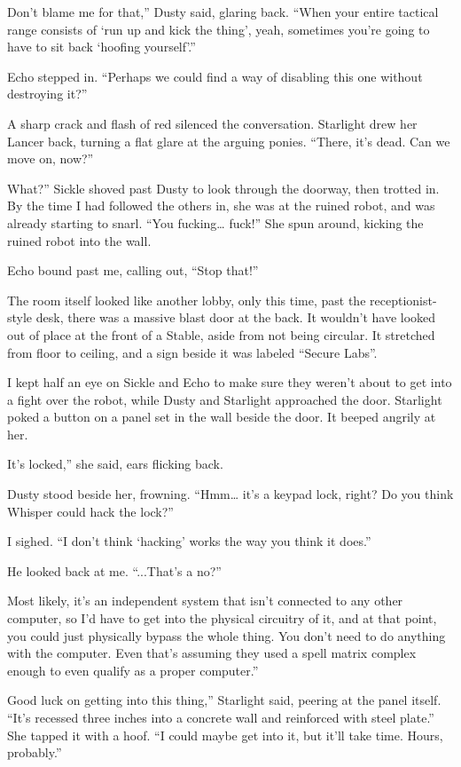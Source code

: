 \leavevmode{}Don’t blame me for that,” Dusty said, glaring back. “When your entire tactical range consists of ‘run up and kick the thing’, yeah, sometimes you’re going to have to sit back ‘hoofing yourself’.”

Echo stepped in. “Perhaps we could find a way of disabling this one without destroying it?”

A sharp crack and flash of red silenced the conversation. Starlight drew her Lancer back, turning a flat glare at the arguing ponies. “There, it’s dead. Can we move on, now?”

\leavevmode{}What?” Sickle shoved past Dusty to look through the doorway, then trotted in. By the time I had followed the others in, she was at the ruined robot, and was already starting to snarl. “You fucking… fuck!” She spun around, kicking the ruined robot into the wall.

Echo bound past me, calling out, “Stop that!”

The room itself looked like another lobby, only this time, past the receptionist-style desk, there was a massive blast door at the back. It wouldn’t have looked out of place at the front of a Stable, aside from not being circular. It stretched from floor to ceiling, and a sign beside it was labeled “Secure Labs”.

I kept half an eye on Sickle and Echo to make sure they weren’t about to get into a fight over the robot, while Dusty and Starlight approached the door. Starlight poked a button on a panel set in the wall beside the door. It beeped angrily at her.

\leavevmode{}It’s locked,” she said, ears flicking back.

Dusty stood beside her, frowning. “Hmm… it’s a keypad lock, right? Do you think Whisper could hack the lock?”

I sighed. “I don’t think ‘hacking’ works the way you think it does.”

He looked back at me. “...That’s a no?”

\leavevmode{}Most likely, it’s an independent system that isn’t connected to any other computer, so I’d have to get into the physical circuitry of it, and at that point, you could just physically bypass the whole thing. You don’t need to do anything with the computer. Even that’s assuming they used a spell matrix complex enough to even qualify as a proper computer.”

\leavevmode{}Good luck on getting into this thing,” Starlight said, peering at the panel itself. “It’s recessed three inches into a concrete wall and reinforced with steel plate.” She tapped it with a hoof. “I could maybe get into it, but it’ll take time. Hours, probably.”

